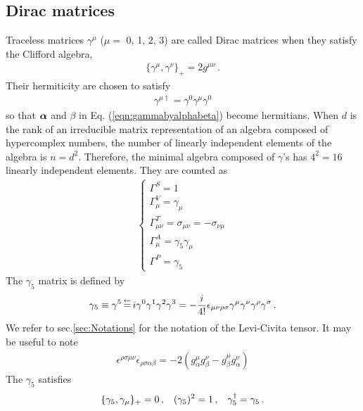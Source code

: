 \subsection{Dirac matrices}
Traceless matrices $\gamma^\mu$ ($\mu =$ 0, 1, 2, 3) are called Dirac matrices
when they satisfy the Clifford algebra,
\begin{eqnarray}
&\{ \gamma^\mu, \gamma^\nu \}_+ = 2 g^{\mu \nu}\,.& 
\label{eqn:DiracGammaClifford}
\end{eqnarray}
Their hermiticity are chosen to satisfy
\begin{eqnarray}
\gamma^{\mu \dagger} =
\gamma^0 \gamma^\mu \gamma^0
\label{eqn:DiracHermitisity}
\end{eqnarray}
so that $\mbox{\boldmath $\alpha$}$ and $\beta$ in Eq. (\ref{eqn:gammabyalphabeta}) become hermitians.
When $d$ is the rank of an irreducible matrix representation of an algebra composed of hypercomplex numbers,
the number of linearly independent elements of the algebra is $n = d^2$. Therefore, the minimal algebra composed
of $\gamma$'s has $4^2 = 16$ linearly independent elements. They are counted as
\begin{eqnarray}
\left\{
\begin{array}{l}
\Gamma^S
=
1
\\
\Gamma^V_\mu
=
\gamma_\mu
\\
\Gamma^T_{\mu \nu}
=
\sigma_{\mu \nu} 
= - \sigma_{\nu \mu} 
\\
\Gamma^A_{\mu}
=
\gamma_5 \gamma_\mu
\\
\Gamma^P
=
\gamma_5
\end{array}
\right.
\end{eqnarray}
The $\gamma_5$ matrix is defined by
\begin{eqnarray}
\gamma_5 \equiv \gamma^5 \,\mbox{$\stackrel{\leftarrow}{=}$}\,
i \gamma^0 \gamma^1 \gamma^2 \gamma^3
=
- \frac{i}{4!}
\epsilon_{\mu \nu \rho \sigma}
\gamma^\mu \gamma^\nu \gamma^\rho \gamma^\sigma \,.
\label{eqn:defgamma5}
\end{eqnarray}
We refer to sec.\ref{sec:Notations} for the notation of the Levi-Civita tensor.
It may be useful to note
\begin{eqnarray}
\epsilon^{\rho \sigma \mu \nu }
\epsilon_{\rho \sigma \alpha \beta }
=
-2 \left(
g^\mu_\alpha g^\nu_\beta 
-
g^\mu_\beta  g^\nu_\alpha
\right)
\end{eqnarray}
The $\gamma_5$ satisfies
\begin{eqnarray}
\{
\gamma_5, \gamma_\mu 
\}_+ = 0\,,
\hspace{3mm}
(\gamma_5)^2 = 1\,,
\hspace{3mm}
\gamma_5^\dagger = \gamma_5 \,.
\end{eqnarray}
